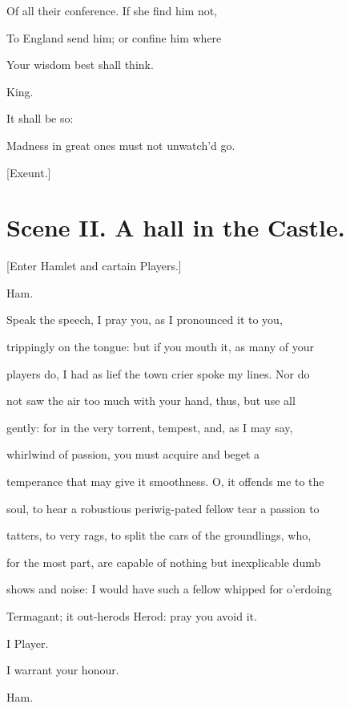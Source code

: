 \documentclass[12pt]{book}
\begin{document}
Of all their conference. If she find him not,

To England send him; or confine him where

Your wisdom best shall think.



King.

It shall be so:

Madness in great ones must not unwatch'd go.



[Exeunt.]







\section*{Scene II. A hall in the Castle.}



[Enter Hamlet and cartain Players.]



Ham.

Speak the speech, I pray you, as I pronounced it to you,

trippingly on the tongue: but if you mouth it, as many of your

players do, I had as lief the town crier spoke my lines. Nor do

not saw the air too much with your hand, thus, but use all

gently: for in the very torrent, tempest, and, as I may say,

whirlwind of passion, you must acquire and beget a

temperance that may give it smoothness. O, it offends me to the

soul, to hear a robustious periwig-pated fellow tear a passion to

tatters, to very rags, to split the cars of the groundlings, who,

for the most part, are capable of nothing but inexplicable dumb

shows and noise: I would have such a fellow whipped for o'erdoing

Termagant; it out-herods Herod: pray you avoid it.



I Player.

I warrant your honour.



Ham.
\end{document}
